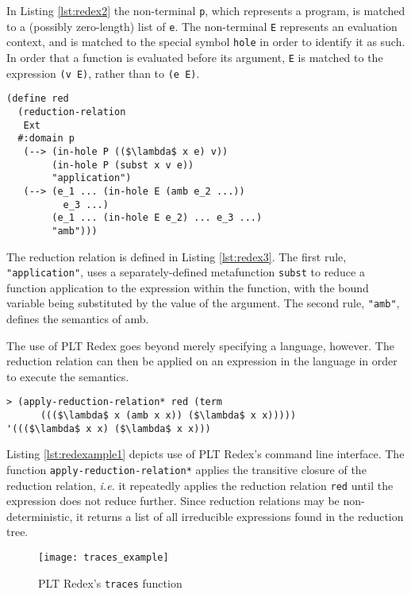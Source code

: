 \documentclass[12pt,a4paper,twoside,openright]{report}
\begin{document}
In Listing \ref{lst:redex2} the non-terminal \texttt{p}, which represents a program, is matched to a (possibly zero-length) list of \texttt{e}. The non-terminal \texttt{E} represents an evaluation context, and is matched to the special symbol \texttt{hole} in order to identify it as such. In order that a function is evaluated before its argument, \texttt{E} is matched to the expression \texttt{(v E)}, rather than to \texttt{(e E)}.

\begin{lstlisting}[caption=Defining a reduction relation in PLT Redex,label={lst:redex3}]
(define red
  (reduction-relation
   Ext
  #:domain p
   (--> (in-hole P (($\lambda$ x e) v))
        (in-hole P (subst x v e))
        "application")
   (--> (e_1 ... (in-hole E (amb e_2 ...)) 
          e_3 ...)
        (e_1 ... (in-hole E e_2) ... e_3 ...)
        "amb")))
\end{lstlisting}

The reduction relation is defined in Listing \ref{lst:redex3}. The first rule, \texttt{"application"}, uses a separately-defined metafunction \texttt{subst} to reduce a function application to the expression within the function, with the bound variable being substituted by the value of the argument. The second rule, \texttt{"amb"}, defines the semantics of amb.

The use of PLT Redex goes beyond merely specifying a language, however. The reduction relation can then be applied on an expression in the language in order to execute the semantics.

\begin{lstlisting}[caption=Applying the reduction relation with transitiv closure,label={lst:redexample1}]
> (apply-reduction-relation* red (term
      ((($\lambda$ x (amb x x)) ($\lambda$ x x)))))
'((($\lambda$ x x) ($\lambda$ x x)))
\end{lstlisting}

Listing \ref{lst:redexample1} depicts use of PLT Redex's command line interface. The function \texttt{apply-reduction-relation*} applies the transitive closure of the reduction relation, \textit{i.e.} it repeatedly applies the reduction relation \texttt{red} until the expression does not reduce further. Since reduction relations may be non-deterministic, it returns a list of all irreducible expressions found in the reduction tree.

\begin{figure}
\centering
\caption{PLT Redex's \texttt{traces} function}
\label{fig:traces_example}
\texttt{[image: traces\_example]}
\end{figure}
\end{document}
